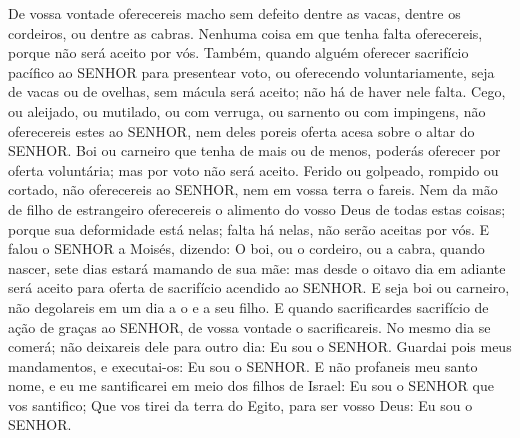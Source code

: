 {De vossa vontade oferecereis macho sem defeito dentre as vacas, dentre os cordeiros, ou dentre as cabras.
Nenhuma coisa em que tenha falta oferecereis, porque não será aceito por vós.
Também, quando alguém oferecer sacrifício pacífico ao SENHOR para presentear voto, ou oferecendo voluntariamente, seja de vacas ou de ovelhas, sem mácula será aceito; não há de haver nele falta.
Cego, ou aleijado, ou mutilado, ou com verruga, ou sarnento ou com impingens, não oferecereis estes ao SENHOR, nem deles poreis oferta acesa sobre o altar do SENHOR.
Boi ou carneiro que tenha de mais ou de menos, poderás oferecer por oferta voluntária; mas por voto não será aceito.
Ferido ou golpeado, rompido ou cortado, não oferecereis ao SENHOR, nem em vossa terra o fareis.
Nem da mão de filho de estrangeiro oferecereis o alimento do vosso Deus de todas estas coisas; porque sua deformidade está nelas; falta há nelas, não serão aceitas por vós.
E falou o SENHOR a Moisés, dizendo:
O boi, ou o cordeiro, ou a cabra, quando nascer, sete dias estará mamando de sua mãe: mas desde o oitavo dia em adiante será aceito para oferta de sacrifício acendido ao SENHOR.
E seja boi ou carneiro, não degolareis em um dia a o e a seu filho.
E quando sacrificardes sacrifício de ação de graças ao SENHOR, de vossa vontade o sacrificareis.
No mesmo dia se comerá; não deixareis dele para outro dia: Eu sou o SENHOR.
Guardai pois meus mandamentos, e executai-os: Eu sou o SENHOR.
E não profaneis meu santo nome, e eu me santificarei em meio dos filhos de Israel: Eu sou o SENHOR que vos santifico;
Que vos tirei da terra do Egito, para ser vosso Deus: Eu sou o SENHOR.

}
